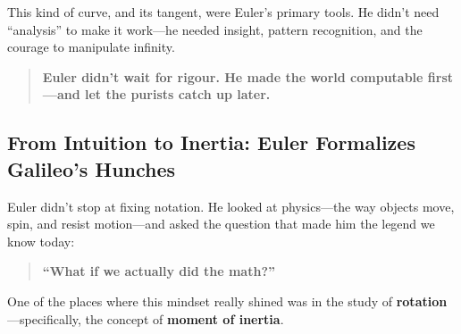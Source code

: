 \begin{center}
\end{center}

This kind of curve, and its tangent, were Euler’s primary tools. He didn’t need “analysis” to make it work—he needed insight, pattern recognition, and the courage to manipulate infinity.

\begin{quote}
\textbf{Euler didn’t wait for rigour. He made the world computable first—and let the purists catch up later.}
\end{quote}


\subsection{From Intuition to Inertia: Euler Formalizes Galileo's Hunches}

Euler didn’t stop at fixing notation. He looked at physics—the way objects move, spin, and resist motion—and asked the question that made him the legend we know today:

\begin{quote}
\textbf{“What if we actually did the math?”}
\end{quote}

One of the places where this mindset really shined was in the study of \textbf{rotation}—specifically, the concept of \textbf{moment of inertia}.


